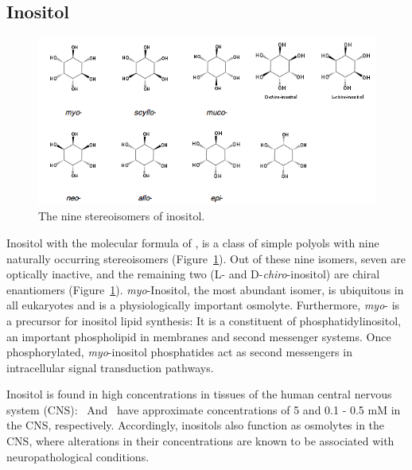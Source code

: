 \subsection{Inositol}
\begin{figure}
	\centering
	\includegraphics[width=6in]{figures/introduction/inositol.png}
	\caption[Inositol stereoisomers]{The nine stereoisomers of inositol.}
	\label{fig:inositols}
\end{figure}

Inositol with the molecular formula of , is a class of simple polyols with nine naturally occurring stereoisomers (Figure~\ref{fig:inositols}). Out of these nine isomers, seven are optically inactive, and the remaining two (L- and D-\emph{chiro}-inositol) are chiral enantiomers (Figure~\ref{fig:inositols}). \emph{myo}-Inositol, the most abundant isomer, is ubiquitous in all eukaryotes and is a physiologically important osmolyte. Furthermore, \emph{myo}- is a precursor for inositol lipid synthesis: It is a constituent of phosphatidylinositol, an important phospholipid in membranes and second messenger systems. Once phosphorylated, \emph{myo}-inositol phosphatides act as second messengers in intracellular signal transduction pathways.\cite{Fisher:2002tk} 

Inositol is found in high concentrations in tissues of the human central nervous system (CNS): \myo\ And \scylloi\ have approximate concentrations of 5 and 0.1 - 0.5 mM in the CNS, respectively.\cite{Fisher:2002tk} Accordingly, inositols also function as osmolytes in the CNS, where alterations in their concentrations are known to be associated with neuropathological conditions.\cite{Michaelis:1993gf, Fisher:2002tk}

